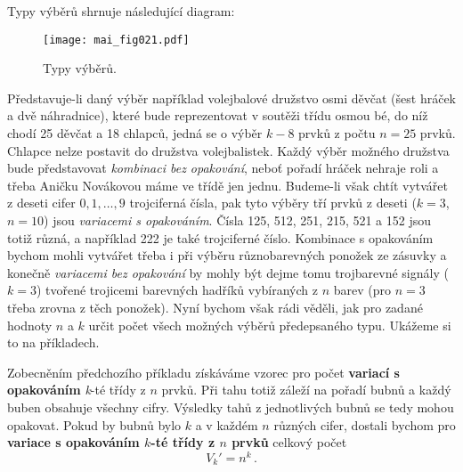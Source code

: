       Typy výběrů shrnuje následující diagram:
      \begin{figure}[ht!] %
        \centering
        \texttt{[image: mai\_fig021.pdf]}
        \caption{Typy výběrů. \cite[s.~201]{Musilova2009MA1}}
        \label{mai:fig021}
      \end{figure}

      Představuje-li daný výběr například volejbalové družstvo osmi děvčat (šest hráček a dvě 
      náhradnice), které bude reprezentovat v soutěži třídu osmou bé, do níž chodí \num{25} děvčat 
      a \num{18} chlapců, jedná se o výběr \(k - 8\) prvků z počtu \(n = 25\) prvků. Chlapce nelze 
      postavit do družstva volejbalistek. Každý výběr možného družstva bude představovat 
      \emph{kombinaci bez opakování}, neboť pořadí hráček nehraje roli a třeba Aničku Novákovou 
      máme ve třídě jen jednu. Budeme-li však chtít vytvářet z deseti cifer \(0, 1, \ldots, 9\) 
      trojciferná čísla, pak tyto výběry tří prvků z deseti (\(k = 3\), \(n = 10\)) jsou 
      \emph{variacemi s opakováním}. Čísla \num{125}, \num{512}, \num{251}, \num{215}, \num{521} a 
      \num{152} jsou totiž různá, a například \num{222} je také trojciferné číslo. Kombinace s 
      opakováním bychom mohli vytvářet třeba i při výběru různobarevných ponožek ze zásuvky a 
      konečně \emph{variacemi bez opakování} by mohly být dejme tomu trojbarevné signály (\(k = 
      3\)) tvořené trojicemi barevných hadříků vybíraných z \(n\) barev (pro \(n = 3\) třeba zrovna 
      z těch ponožek). Nyní bychom však rádi věděli, jak pro zadané hodnoty \(n\) a \(k\) určit 
      počet všech možných výběrů předepsaného typu. Ukážeme si to na příkladech.

      
      
      Zobecněním předchozího příkladu získáváme vzorec pro počet \textbf{variací s opakováním} 
      \emph{k}-té třídy z \(n\) prvků. Při tahu totiž záleží na pořadí bubnů a každý buben obsahuje 
      všechny cifry. Výsledky tahů z jednotlivých bubnů se tedy mohou opakovat. Pokud by bubnů bylo 
      \(k\) a v každém \(n\) různých cifer, dostali bychom pro \textbf{variace s opakováním 
      \(k\)-té třídy z \(n\) prvků} celkový počet
      \begin{equation}\label{mai:eq007}
        \boxed{V_k' = n^k}\, .
      \end{equation}


